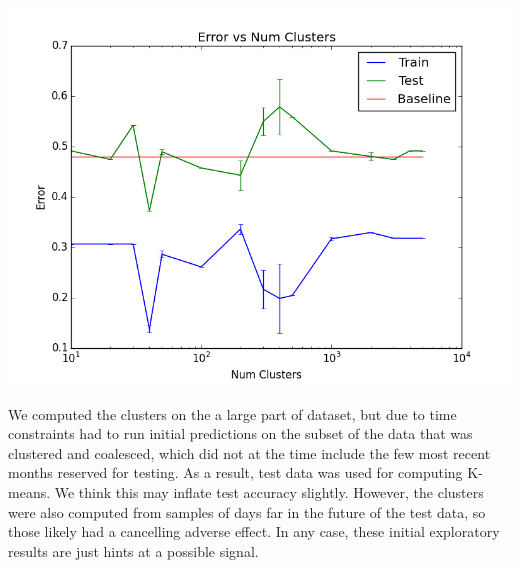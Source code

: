 \includegraphics{error_v_k.png}

We computed the clusters on the a large part of dataset, but due to time constraints had to run initial predictions on the subset of the data that was clustered and coalesced, which did not at the time include the few most recent months reserved for testing. As a result, test data was used for computing K-means. We think this may inflate test accuracy slightly. However, the clusters were also computed from samples of days far in the future of the test data, so those likely had a cancelling adverse effect. In any case, these initial exploratory results are just hints at a possible signal.